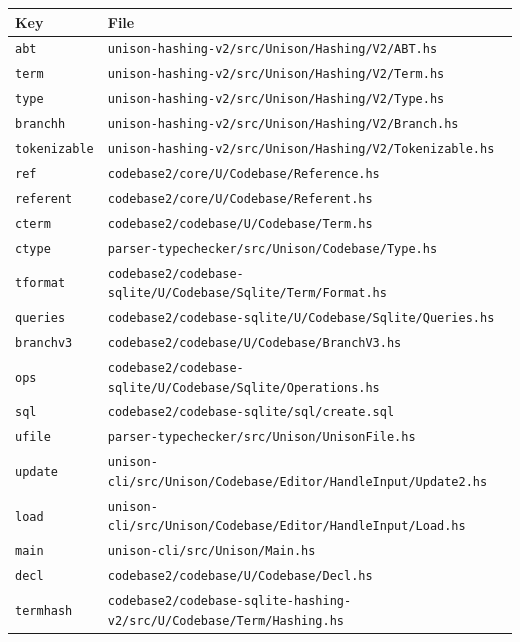 \documentclass[11pt]{article}
\theoremstyle{definition}
\theoremstyle{plain}
\theoremstyle{remark}
\begin{document}
\begin{center}
\small
\begin{tabular}{@{}ll@{}}
\toprule
Key & File \\
\midrule
\texttt{abt}      & \texttt{unison-hashing-v2/src/Unison/Hashing/V2/ABT.hs} \\
\texttt{term}     & \texttt{unison-hashing-v2/src/Unison/Hashing/V2/Term.hs} \\
\texttt{type}     & \texttt{unison-hashing-v2/src/Unison/Hashing/V2/Type.hs} \\
\texttt{branchh}  & \texttt{unison-hashing-v2/src/Unison/Hashing/V2/Branch.hs} \\
\texttt{tokenizable} & \texttt{unison-hashing-v2/src/Unison/Hashing/V2/Tokenizable.hs} \\
\texttt{ref}      & \texttt{codebase2/core/U/Codebase/Reference.hs} \\
\texttt{referent} & \texttt{codebase2/core/U/Codebase/Referent.hs} \\
\texttt{cterm}    & \texttt{codebase2/codebase/U/Codebase/Term.hs} \\
\texttt{ctype}    & \texttt{parser-typechecker/src/Unison/Codebase/Type.hs} \\
\texttt{tformat}  & \texttt{codebase2/codebase-sqlite/U/Codebase/Sqlite/Term/Format.hs} \\
\texttt{queries}  & \texttt{codebase2/codebase-sqlite/U/Codebase/Sqlite/Queries.hs} \\
\texttt{branchv3} & \texttt{codebase2/codebase/U/Codebase/BranchV3.hs} \\
\texttt{ops}      & \texttt{codebase2/codebase-sqlite/U/Codebase/Sqlite/Operations.hs} \\
\texttt{sql}      & \texttt{codebase2/codebase-sqlite/sql/create.sql} \\
\texttt{ufile}    & \texttt{parser-typechecker/src/Unison/UnisonFile.hs} \\
\texttt{update}   & \texttt{unison-cli/src/Unison/Codebase/Editor/HandleInput/Update2.hs} \\
\texttt{load}     & \texttt{unison-cli/src/Unison/Codebase/Editor/HandleInput/Load.hs} \\
\texttt{main}     & \texttt{unison-cli/src/Unison/Main.hs} \\
\texttt{decl}     & \texttt{codebase2/codebase/U/Codebase/Decl.hs} \\
\texttt{termhash} & \texttt{codebase2/codebase-sqlite-hashing-v2/src/U/Codebase/Term/Hashing.hs} \\

\end{tabular}
\end{center}
\end{document}
